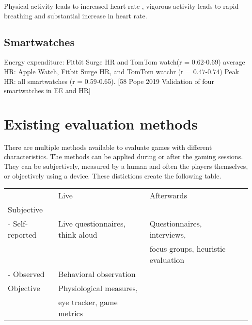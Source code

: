 Physical activity leads to increased heart rate \cite{hammond	1985normal, boettger2010heart, haskell2007recommendation}, vigorous activity leads to rapid breathing and substantial increase in heart rate. \cite{haskell2007recommendation}

\section{Smartwatches}
Energy expenditure: Fitbit Surge HR and TomTom watch(r = 0.62-0.69)
average HR: Apple Watch, Fitbit Surge HR, and TomTom watchr (r = 0.47-0.74)
Peak HR:  all smartwatches  (r = 0.59-0.65).  [58 Pope 2019 Validation of four smartwatches in EE and HR]

\chapter{Existing evaluation methods}
\label{ch:evaluationmethods}


There are multiple methods available to evaluate games with different characteristics. The methods can be applied during or after the gaming sessions. They can be subjectively, measured by a human and often the players themselves, or objectively using a device. These distictions create the following table.
 
\begin{table}[]
	\begin{tabular}{llll}
					& Live                                              & Afterwards\\
	Subjective      &                                                   & \\
	- Self-reported & Live questionnaires, think-aloud                  & Questionnaires, interviews,\\ 
					& 													& focus groups, heuristic evaluation \\
	- Observed      & Behavioral observation 							& \\
	Objective       & Physiological measures, 							& \\  
					& eye tracker, game metrics         				&\\                                                    
	\end{tabular}
\end{table}                                             								


